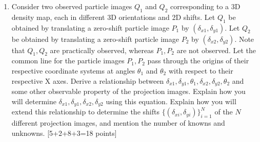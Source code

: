 \documentclass[11pt]{article}
\begin{document}
\begin{enumerate}
\item Consider two observed particle images $Q_1$ and $Q_2$ corresponding to a 3D density map, each in different 3D orientations and 2D shifts. Let $Q_1$ be obtained by translating a zero-shift particle image $P_1$ by $(\delta_{x1},\delta_{y1})$.  Let $Q_2$ be obtained by translating a zero-shift particle image $P_2$ by $(\delta_{x2},\delta_{y2})$. Note that $Q_1, Q_2$ are practically observed, whereas $P_1, P_2$ are not observed. Let the common line for the particle images $P_1, P_2$ pass through the origins of their respective coordinate systems at angles $\theta_1$ and $\theta_2$ with respect to their respective X axes. Derive a relationship between $\delta_{x1},\delta_{y1}, \theta_1, \delta_{x2},\delta_{y2}, \theta_2$ and some other observable property of the projection images. Explain how you will determine $\delta_{x1}, \delta_{y1}, \delta_{x2}, \delta_{y2}$ using this equation. Explain how you will extend this relationship to determine the shifts $\{(\delta_{xi},\delta_{yi})\}_{i=1}^N$ of the $N$ different projection images, and mention the number of knowns and unknowns. \textsf{[5+2+8+3=18 points]}


\end{enumerate}
\end{document}
